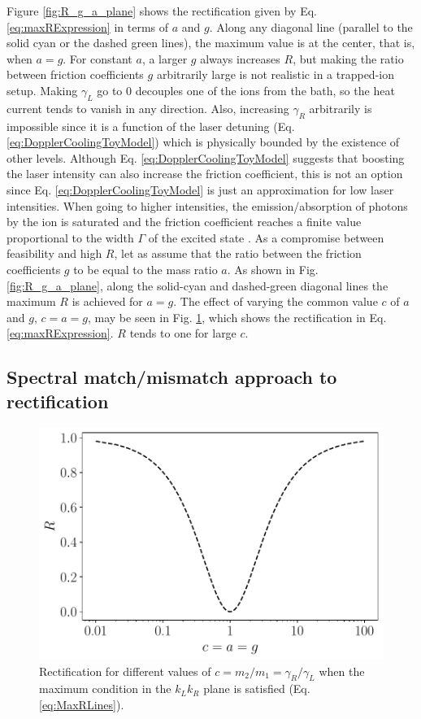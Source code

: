 Figure \ref{fig:R_g_a_plane} shows the rectification given by Eq. \eqref{eq:maxRExpression} in terms of $a$ and $g$. Along any diagonal line (parallel to the solid cyan or the dashed green lines), the maximum value is at the center, that is, when $a = g$. For constant $a$, a larger $g$ always increases $R$, but making the  ratio between friction coefficients $g$ arbitrarily large is not  realistic in a trapped-ion setup.
Making $\gamma_L$ go to 0 decouples one of the ions from the bath, so the heat current tends to vanish in any direction. Also, increasing $\gamma_R$ arbitrarily is impossible since it is a function of the laser detuning (Eq. \eqref{eq:DopplerCoolingToyModel}) which is physically bounded
by the existence of other levels. Although Eq. \eqref{eq:DopplerCoolingToyModel} suggests that boosting the laser intensity can also increase the friction coefficient, this is not an option since Eq. \eqref{eq:DopplerCoolingToyModel} is just an approximation for low laser intensities. When going to higher intensities, the emission/absorption of photons by the ion is saturated and the friction coefficient reaches a finite value proportional to the width $\Gamma$ of the excited state \cite{Metcalf2003}. As a compromise between feasibility and high $R$, let as assume that the ratio between the friction coefficients $g$ to be equal to the mass ratio $a$. As shown  in Fig. \ref{fig:R_g_a_plane}, along the solid-cyan and dashed-green diagonal lines the maximum $R$ is achieved for $a = g$. The effect of varying  the common value $c$ of $a$ and $g$, $c=a = g$, may be seen in
Fig. \ref{fig:Fig_PerfectRectification}, which  shows the rectification in Eq. \eqref{eq:maxRExpression}. $R$ tends to one for large $c$.
%
%
\subsection{Spectral match/mismatch approach to rectification}
%
%
%
\begin{figure}
  \includegraphics[width=\linewidth]{Figures/CC.pdf}
  \caption{Rectification for different values of $c=m_2/m_1=\gamma_R/\gamma_L$ when the maximum condition in the $k_L k_R$ plane is satisfied (Eq. \eqref{eq:MaxRLines}).}
  \label{fig:Fig_PerfectRectification}
\end{figure}

